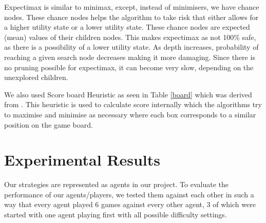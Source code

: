 \documentclass{svproc}
\begin{document}
Expectimax is similar to minimax, except, instead of minimisers, we have chance nodes. These chance nodes helps the algorithm to take risk that either allows for a higher utility state or a lower utility state. These chance nodes are expected (mean) values of their children nodes. This makes expectimax as not 100\% safe, as there is a possibility of a lower utility state. As depth increases, probability of reaching a given search node decreases making it more damaging. Since there is no pruning possible for expectimax, it can become very slow, depending on the unexplored children.

We also used Score board Heuristic as seen in Table \ref{board} which was derived from \cite{hboard}. This heuristic is used to calculate score internally which the algorithms try to maximise and minimise as necessary where each box corresponds to a similar position on the game board.

\begin{table}[H]
\centering
\begin{adjustbox}{width=4cm,center}
\end{adjustbox}
\caption{Score Board Heuristic}
\label{board}
\end{table}

\section{Experimental Results}\label{4}

Our strategies are represented as agents in our project. To evaluate the performance of our agents/players, we tested them against each other in such a way that every agent played 6 games against every other agent, 3 of which were started with one agent playing first with all possible difficulty settings.
\end{document}
